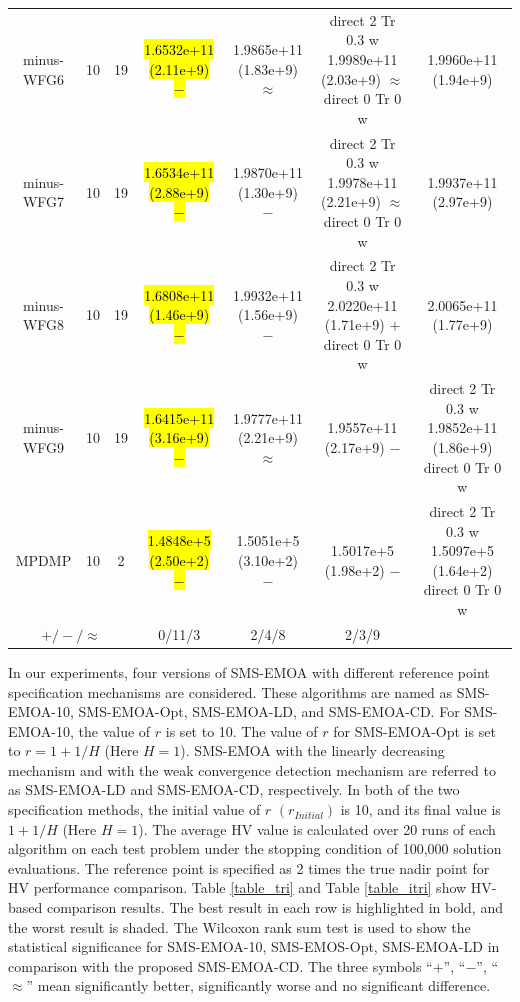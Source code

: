 \documentclass[conference]{IEEEtran}
\newcommand{\semitextbf}[1]{%
	\pdfliteral direct {2 Tr 0.3 w} %
	#1%
	\pdfliteral direct {0 Tr 0 w}%
}
\begin{document}
\begin{table}[!t]
\begin{tabular}{ccccccc}
    \multirow{1}{*}{minus-WFG6}&10&19&\hl{1.6532e+11 (2.11e+9) $-$}&1.9865e+11 (1.83e+9) $\approx$&\semitextbf{1.9989e+11 (2.03e+9) $\approx$}&1.9960e+11 (1.94e+9)\\
    \multirow{1}{*}{minus-WFG7}&10&19&\hl{1.6534e+11 (2.88e+9) $-$}&1.9870e+11 (1.30e+9) $-$&\semitextbf{1.9978e+11 (2.21e+9) $\approx$}&1.9937e+11 (2.97e+9)\\
    \multirow{1}{*}{minus-WFG8}&10&19&\hl{1.6808e+11 (1.46e+9) $-$}&1.9932e+11 (1.56e+9) $-$&\semitextbf{2.0220e+11 (1.71e+9) $+$}&2.0065e+11 (1.77e+9)\\
    \multirow{1}{*}{minus-WFG9}&10&19&\hl{1.6415e+11 (3.16e+9) $-$}&1.9777e+11 (2.21e+9) $\approx$&1.9557e+11 (2.17e+9) $-$&\semitextbf{1.9852e+11 (1.86e+9)}\\
    \midrule
    \multirow{1}{*}{MPDMP}&10&2&\hl{1.4848e+5 (2.50e+2) $-$}&1.5051e+5 (3.10e+2) $-$&1.5017e+5 (1.98e+2) $-$&\semitextbf{1.5097e+5 (1.64e+2)}\\
    \midrule
    \multicolumn{3}{c}{$+/-/\approx$}&0/11/3&2/4/8&2/3/9&\\
    \bottomrule
  \end{tabular}
\end{table}

In our experiments, four versions of SMS-EMOA with different reference point specification mechanisms are considered. 
These algorithms are named as SMS-EMOA-10, SMS-EMOA-Opt, SMS-EMOA-LD, and SMS-EMOA-CD. 
For SMS-EMOA-10, the value of $r$ is set to 10. 
The value of $r$ for SMS-EMOA-Opt is set to $r=1+1/H$ (Here $H=1$). 
SMS-EMOA with the linearly decreasing mechanism and with the weak convergence detection mechanism are referred to as SMS-EMOA-LD and SMS-EMOA-CD, respectively. 
In both of the two specification methods, the initial value of $r$ $(r_{Initial})$ is 10, and its final value is $1+1/H$ (Here $H=1$). 
The average HV value is calculated over 20 runs of each algorithm on each test problem under the stopping condition of 100,000 solution evaluations. 
The reference point is specified as 2 times the true nadir point for HV performance comparison.
Table \ref{table_tri} and Table \ref{table_itri} show HV-based comparison results. 
The best result in each row is highlighted in bold, and the worst result is shaded. 
The Wilcoxon rank sum test is used to show the statistical significance for SMS-EMOA-10, SMS-EMOS-Opt, SMS-EMOA-LD in comparison with the proposed SMS-EMOA-CD. 
The three symbols ``$+$'', ``$-$'', ``$\approx$'' mean significantly better, significantly worse and no significant difference. 
\end{document}

